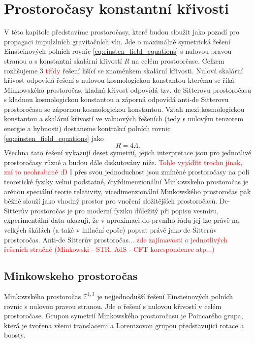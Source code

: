 \chapter{Prostoročasy konstantní křivosti}
\label{chap:kap01}
V této kapitole představíme prostoročasy, které budou sloužit jako pozadí pro propagaci impulzlních gravitačních vln. Jde o maximálně
symetrická řešení Einsteinových polních rovnic \eqref{eq:einsten_field_equations} s nulovou pravou stranou a s konstantní skalární křivostí $R$ na celém prostoorčase.
Celkem rozlišujeme 3 \textcolor{red}{třídy} řešení lišící se znaménkem skalární křivosti. Nulová skalární křivost odpovídá řešení s nulovou
kosmologickou konstantou kterému se říká Minkowského prostoročas, kladná křivost odpovídá tzv. de Sitterovu prostoročasu s kladnou kosmologickou
konstantou a záporná odpovídá anti-de Sitterovu prostoročasu se zápornou kosmologickou konstantou. Vztah mezi kosmologickou konstantou a skalární
křivostí ve vakuových řešeních (tedy s nulovým tenzorem energie a hybnosti) dostaneme kontrakcí polních rovnic \eqref{eq:einsten_field_equations} jako
\begin{equation}
     R = 4 \Lambda.
\end{equation}
Všechna tato řešení vykazují deset symetrií, jejich interpretace jsou pro jednotlivé prostoročasy různé a budou dále diskutovány níže. \textcolor{red}{Tohle vyjádřit trochu jinak, zní to neohrabaně :D}
I přes svou jednoduchost jsou zmíněné prostoročasy na poli teoretické fyziky velmi podstatné, čtyřdimenzionální Minkowskeho prostoročas je arénou speciální
teorie relativity, vícedimenzionální Minkowského prostoročas pak běžně slouží jako vhodný prostor pro vnoření složitějších prostoročasů.
De-Sitterův prostoročas je pro moderní fyziku důležitý při popisu vesmíru, experimentální data
ukazují, že v aproximaci do prvního řádu jej lze právě na velkých škálách (a také v inflační epoše) popsat právě jako de Sitterův prostoročas.
Anti-de Sitterův prostoročas... \cite{Bicak:2000ea} \textcolor{red}{zde zajímavosti
o jednotlivých řešeních stručně (Minkowski - STR, AdS - CFT korespondence atp...)}


\section{Minkowskeho prostoročas}
Minkowského prostoročas $\mathbb{E}^{1,3}$ je nejjednodušší řešení Einsteinových polních rovnic s nulovou pravou stranou.
Jde o řešení s nulovou křivostí v celém prostoročase. Grupou symetrií Minkowského prostoročasu je Poincarého
grupa, která je tvořena všemi translacemi a Lorentzovou grupou představující rotace a boosty.

